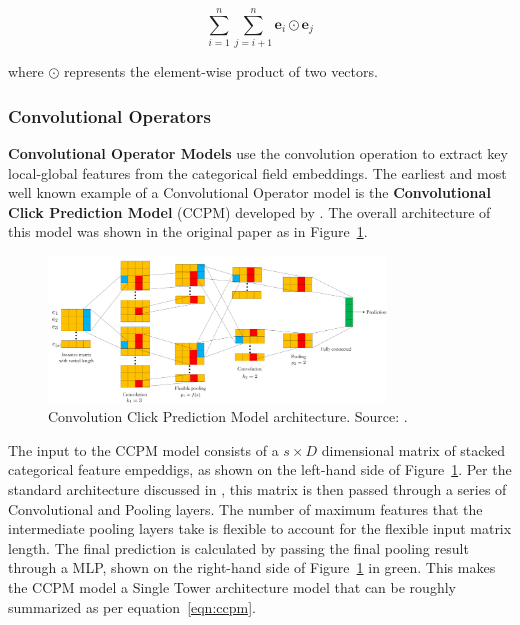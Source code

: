 \documentclass{mldsmsc}
\begin{document}
\begin{equation}
    \sum_{i=1}^{n} \sum_{j=i+1}^{n} \mathbf{e}_i \odot \mathbf{e}_j
\end{equation}

where $\odot$ represents the element-wise product of two vectors.

\subsubsection{Convolutional Operators}

\textbf{Convolutional Operator Models} use the convolution operation to extract key local-global
features from the categorical field embeddings. The earliest and most well known example of a
Convolutional Operator model is the \textbf{Convolutional Click Prediction Model} (CCPM)
developed by \cite{RefWorks:liu2015convolutional}. The overall architecture of this model
was shown in the original paper as in Figure~\ref{fig:ccpm}.

\begin{figure}[h]
    \centering
    \includegraphics[width=0.8\textwidth]{../figures/ccpm}
    \caption{Convolution Click Prediction Model architecture. Source: \citep{RefWorks:liu2015convolutional}.}
    \label{fig:ccpm}
\end{figure}

The input to the CCPM model consists of a $s \times D$ dimensional matrix of stacked categorical
feature empeddigs, as shown on the left-hand side of Figure~\ref{fig:ccpm}. Per the standard
architecture discussed in \citep{RefWorks:liu2015convolutional}, this matrix is then passed through
a series of Convolutional and Pooling layers. The number
of maximum features that the intermediate pooling layers take is flexible to account for the
flexible input matrix length. The final prediction is calculated by passing the final
pooling result through a MLP, shown on the right-hand side of Figure~\ref{fig:ccpm} in green.
This makes the CCPM model a Single Tower architecture model that can be roughly summarized
as per equation~\ref{eqn:ccpm}.
\end{document}
